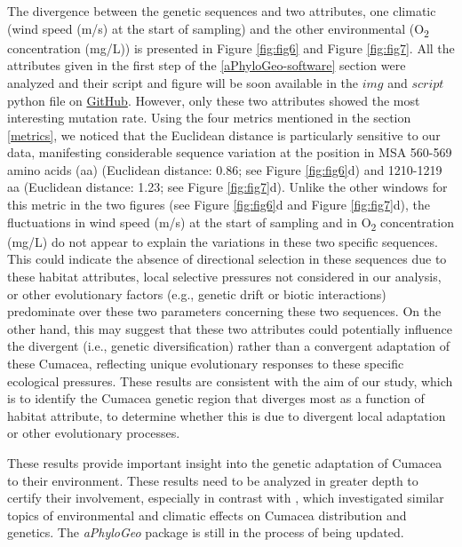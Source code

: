 {The divergence between the genetic sequences and two attributes, one climatic (wind speed (m/s) at the start of sampling) and the other environmental (O\textsubscript{2} concentration (mg/L)) is presented in Figure \ref{fig:fig6} and Figure \ref{fig:fig7}. All the attributes given in the first step of the \autoref{aPhyloGeo-software} section were analyzed and their script and figure will be soon available in the $img$ and $script$ python file on \href{https://github.com/tahiri-lab/Cumacea_aPhyloGeo}{GitHub}. However, only these two attributes showed the most interesting mutation rate. Using the four metrics mentioned in the section \autoref{metrics}, we noticed that the Euclidean distance is particularly sensitive to our data, manifesting considerable sequence variation at the position in MSA 560-569 amino acids (aa) (Euclidean distance: 0.86; see Figure \ref{fig:fig6}d) and 1210-1219 aa (Euclidean distance: 1.23; see Figure \ref{fig:fig7}d). Unlike the other windows for this metric in the two figures (see Figure \ref{fig:fig6}d and Figure \ref{fig:fig7}d), the fluctuations in wind speed (m/s) at the start of sampling and in O\textsubscript{2} concentration (mg/L) do not appear to explain the variations in these two specific sequences. This could indicate the absence of directional selection in these sequences due to these habitat attributes, local selective pressures not considered in our analysis, or other evolutionary factors (e.g., genetic drift or biotic interactions) predominate over these two parameters concerning these two sequences. On the other hand, this may suggest that these two attributes could potentially influence the divergent (i.e., genetic diversification) rather than a convergent adaptation of these Cumacea, reflecting unique evolutionary responses to these specific ecological pressures. These results are consistent with the aim of our study, which is to identify the Cumacea genetic region that diverges most as a function of habitat attribute, to determine whether this is due to divergent local adaptation or other evolutionary processes.

These results provide important insight into the genetic adaptation of Cumacea to their environment. These results need to be analyzed in greater depth to certify their involvement, especially in contrast with \citep{uhlir_adding_2021}, which investigated similar topics of environmental and climatic effects on Cumacea distribution and genetics. The \textit{aPhyloGeo} package is still in the process of being updated.

}
